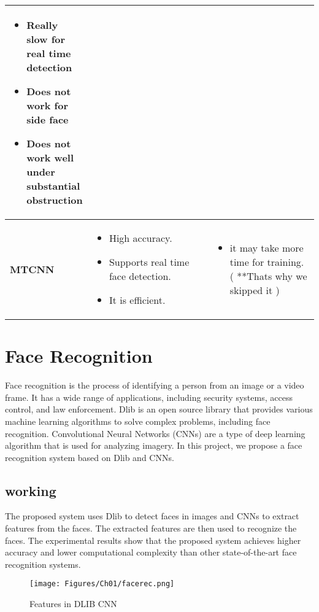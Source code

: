 \begin{table}[h]
\begin{tabular}{|p{0.25\linewidth}|p{0.4\linewidth}|p{0.4\linewidth}|}
\begin{itemize}
    \item Really slow for
    real time
    detection
    \item Does not work for
    side face
    \item  Does not work
    well under
    substantial
    obstruction
    \end{itemize} \\
    \hline
    \textbf{MTCNN} & 
    \begin{itemize}
    \item High accuracy.
    \item Supports real time face
    detection.
    \item It is efficient.
    \end{itemize}
    &
    \begin{itemize}
    \item it may take more
    time for training. ( **Thats why we skipped it )
    \end{itemize} \\
    \hline
    \end{tabular}
    \label{tab:itemX}
    \end{table}

\clearpage
\section{Face Recognition}
Face recognition is the process of identifying a person from an image or a video frame. It has a wide range of applications, including security systems, access control, and law enforcement. Dlib is an open source library that provides various machine learning algorithms to solve complex problems, including face recognition. Convolutional Neural Networks (CNNs) are a type of deep learning algorithm that is used for analyzing imagery. In this project, we propose a face recognition system based on Dlib and CNNs.

\subsection*{working}
The proposed system uses Dlib to detect faces in images and CNNs to extract features from the faces. The extracted features are then used to recognize the faces. The experimental results show that the proposed system achieves higher accuracy and lower computational complexity than other state-of-the-art face recognition systems.
\begin{figure}[!htb]
    \centering
    \texttt{[image: Figures/Ch01/facerec.png]}
    \caption{Features in DLIB CNN}
    \label{figure:DLIB}
    \end{figure}


